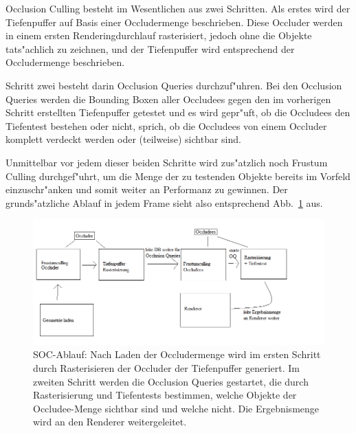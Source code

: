 \documentclass[journal]{vgtc}
\begin{document}
Occlusion Culling besteht im Wesentlichen aus zwei Schritten. Als erstes wird der Tiefenpuffer auf Basis einer Occludermenge beschrieben. Diese Occluder werden in einem ersten Renderingdurchlauf rasterisiert, jedoch ohne die Objekte tats"achlich zu zeichnen, und der Tiefenpuffer wird entsprechend der Occludermenge beschrieben.

Schritt zwei besteht darin Occlusion Queries durchzuf"uhren. Bei den Occlusion Queries werden die Bounding Boxen aller Occludees gegen den im vorherigen Schritt erstellten Tiefenpuffer getestet und es wird gepr"uft, ob die Occludees den Tiefentest bestehen oder nicht, sprich, ob die Occludees von einem Occluder komplett verdeckt werden oder (teilweise) sichtbar sind.

Unmittelbar vor jedem dieser beiden Schritte wird zus"atzlich noch Frustum Culling durchgef"uhrt, um die Menge der zu testenden Objekte bereits im Vorfeld einzuschr"anken und somit weiter an Performanz zu gewinnen. Der grunds"atzliche Ablauf in jedem Frame sieht also entsprechend Abb.\ \ref{fig:socablauf} aus.
\begin{figure}%
\includegraphics[width=\columnwidth]{images/SOCAblauf2.png}%
\caption{SOC-Ablauf: Nach Laden der Occludermenge wird im ersten Schritt durch Rasterisieren der Occluder der Tiefenpuffer generiert. Im zweiten Schritt werden die Occlusion Queries gestartet, die durch Rasterisierung und Tiefentests bestimmen, welche Objekte der Occludee-Menge sichtbar sind und welche nicht. Die Ergebnismenge wird an den Renderer weitergeleitet.}%
\label{fig:socablauf}%
\end{figure}
\end{document}
